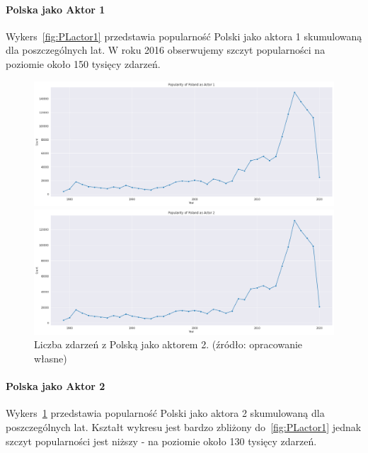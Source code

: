 \documentclass[11pt]{report}
\begin{document}
    \paragraph{Polska jako Aktor 1}
    Wykers~\ref{fig:PLactor1} przedstawia popularność Polski jako aktora 1 skumulowaną dla poszczególnych lat.
    W roku 2016 obserwujemy szczyt popularności na poziomie około 150 tysięcy zdarzeń.
    \begin{figure}[ht!]
        \centering
        \includegraphics[width=1 \textwidth]{fig/PL/PLactor1.png}
        \caption{Liczba zdarzeń z Polską jako aktorem 1. (źródło: opracowanie własne)}
        \label{fig:PLactor1}
        \includegraphics[width=1 \textwidth]{fig/PL/PLactor2.png}
        \caption{Liczba zdarzeń z Polską jako aktorem 2. (źródło: opracowanie własne)}
        \label{fig:PLactor2}
    \end{figure}

    \paragraph{Polska jako Aktor 2}
    Wykers~\ref{fig:PLactor2} przedstawia popularność Polski jako aktora 2 skumulowaną dla poszczególnych lat. Kształt wykresu jest bardzo zbliżony do~\ref{fig:PLactor1} jednak szczyt popularności jest niższy - na poziomie około 130 tysięcy zdarzeń.
\end{document}
